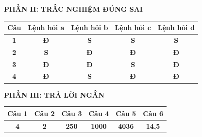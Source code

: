 \documentclass[11pt,a4paper]{article}
\begin{document}
\vspace{0.3cm}
\noindent\textbf{\color{mainGreen}PHẦN II: TRẮC NGHIỆM ĐÚNG SAI}
\begin{center}
\renewcommand{\arraystretch}{1.2}
\begin{tabular}{|c|c|c|c|c|}
\hline
\textbf{Câu} & \textbf{Lệnh hỏi a} & \textbf{Lệnh hỏi b} & \textbf{Lệnh hỏi c} & \textbf{Lệnh hỏi d} \\ \hline
\textbf{1} & \textbf{\color{red}Đ} & \textbf{S} & \textbf{S} & \textbf{S} \\ \hline
\textbf{2} & \textbf{S} & \textbf{\color{red}Đ} & \textbf{\color{red}Đ} & \textbf{\color{red}Đ} \\ \hline
\textbf{3} & \textbf{\color{red}Đ} & \textbf{\color{red}Đ} & \textbf{S} & \textbf{\color{red}Đ} \\ \hline
\textbf{4} & \textbf{\color{red}Đ} & \textbf{S} & \textbf{\color{red}Đ} & \textbf{\color{red}Đ} \\ \hline
\end{tabular}
\end{center}

\vspace{0.3cm}
\noindent\textbf{\color{mainGreen}PHẦN III: TRẢ LỜI NGẮN}
\begin{center}
\renewcommand{\arraystretch}{1.2}
\begin{tabular}{|c|c|c|c|c|c|}
\hline
\textbf{Câu 1} & \textbf{Câu 2} & \textbf{Câu 3} & \textbf{Câu 4} & \textbf{Câu 5} & \textbf{Câu 6} \\ \hline
\textbf{\color{red}4} & \textbf{\color{red}2} & \textbf{\color{red}250} & \textbf{\color{red}1000} & \textbf{\color{red}4036} & \textbf{\color{red}14,5} \\ \hline
\end{tabular}
\end{center}
\end{document}
